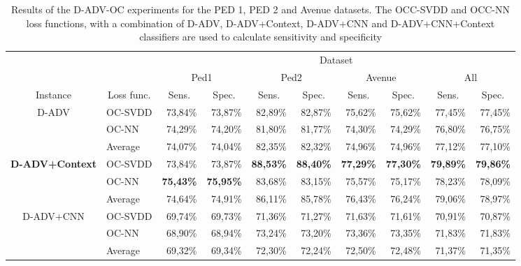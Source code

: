\begin{table}
  \centering
  \caption{Results of the D-ADV-OC experiments for the PED 1, PED 2 and Avenue datasets. The OCC-SVDD and OCC-NN loss functions, with a combination of D-ADV, D-ADV+Context, D-ADV+CNN and D-ADV+CNN+Context classifiers are used to calculate sensitivity and specificity}
    \begin{tabular}{|c|l|r|r|r|r|r|r|r|r|}
\cline{3-10}    \multicolumn{1}{r}{} &       & \multicolumn{8}{c|}{Dataset} \bigstrut\\
\cline{3-10}    \multicolumn{1}{r}{} &       & \multicolumn{2}{c|}{Ped1} & \multicolumn{2}{c|}{Ped2} & \multicolumn{2}{c|}{Avenue} & \multicolumn{2}{c|}{All} \bigstrut\\
    \hline
    Instance & \multicolumn{1}{c|}{Loss func.} & \multicolumn{1}{c|}{Sens.} & \multicolumn{1}{c|}{Spec.} & \multicolumn{1}{c|}{Sens.} & \multicolumn{1}{c|}{Spec.} & \multicolumn{1}{c|}{Sens.} & \multicolumn{1}{c|}{Spec.} & \multicolumn{1}{c|}{Sens.} & \multicolumn{1}{c|}{Spec.} \bigstrut\\
    \hline
    \multirow{3}{*}{D-ADV} & OC-SVDD & 73,84\% & 73,87\% & 82,89\% & 82,87\% & 75,62\% & 75,62\% & 77,45\% & 77,45\% \bigstrut\\
\cline{2-10}          & OC-NN & 74,29\% & 74,20\% & 81,80\% & 81,77\% & 74,30\% & 74,29\% & 76,80\% & 76,75\% \bigstrut\\
\cline{2-10}          & Average & 74,07\% & 74,04\% & 82,35\% & 82,32\% & 74,96\% & 74,96\% & 77,12\% & 77,10\% \bigstrut\\
    \hline
    \multirow{3}{*}{\textbf{D-ADV+Context}} & OC-SVDD & 73,84\% & 73,87\% & \textbf{88,53\%} & \textbf{88,40\%} & \textbf{77,29\%} & \textbf{77,30\%} & \textbf{79,89\%} & \textbf{79,86\%} \bigstrut\\
\cline{2-10}          & OC-NN & \textbf{75,43\%} & \textbf{75,95\%} & 83,68\% & 83,15\% & 75,57\% & 75,17\% & 78,23\% & 78,09\% \bigstrut\\
\cline{2-10}          & Average & 74,64\% & 74,91\% & 86,11\% & 85,78\% & 76,43\% & 76,24\% & 79,06\% & 78,97\% \bigstrut\\
    \hline
    \multirow{3}{*}{D-ADV+CNN} & OC-SVDD & 69,74\% & 69,73\% & 71,36\% & 71,27\% & 71,63\% & 71,61\% & 70,91\% & 70,87\% \bigstrut\\
\cline{2-10}          & OC-NN & 68,90\% & 68,94\% & 73,24\% & 73,20\% & 73,36\% & 73,35\% & 71,83\% & 71,83\% \bigstrut\\
\cline{2-10}          & Average & 69,32\% & 69,34\% & 72,30\% & 72,24\% & 72,50\% & 72,48\% & 71,37\% & 71,35\% \bigstrut\\

\end{tabular}
\end{table}
